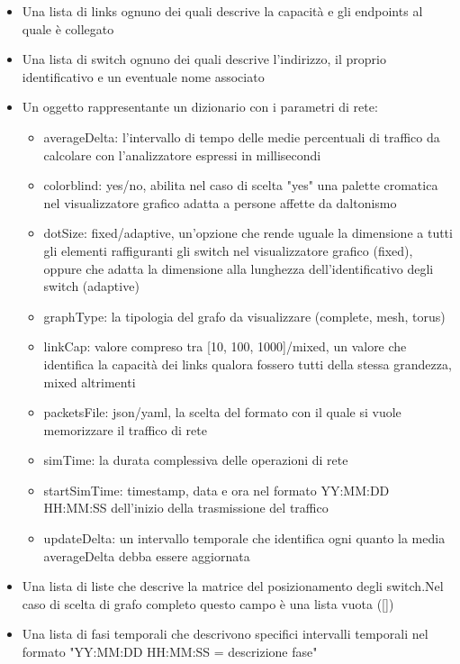 \documentclass[binding=0.6cm]{sapthesis}
\begin{document}
\begin{itemize}
    \item Una lista di links ognuno dei quali descrive la capacità e gli endpoints al quale è collegato
    \item Una lista di switch ognuno dei quali descrive l'indirizzo, il proprio identificativo e un eventuale nome associato
    \item Un oggetto rappresentante un dizionario con i parametri di rete:
    \begin{itemize}
        \item averageDelta: l'intervallo di tempo delle medie percentuali di traffico da calcolare con l'analizzatore espressi in millisecondi
        \item colorblind: yes/no, abilita nel caso di scelta "yes" una palette cromatica nel visualizzatore grafico adatta a persone affette da daltonismo
        \item dotSize: fixed/adaptive, un'opzione che rende uguale la dimensione a tutti gli elementi raffiguranti gli switch nel visualizzatore grafico (fixed), oppure che adatta la dimensione alla lunghezza dell'identificativo degli switch (adaptive)
        \item graphType: la tipologia del grafo da visualizzare (complete, mesh, torus)
        \item linkCap: valore compreso tra [10, 100, 1000]/mixed, un valore che identifica la capacità dei links qualora fossero tutti della stessa grandezza, mixed altrimenti
        \item packetsFile: json/yaml, la scelta del formato con il quale si vuole memorizzare il traffico di rete
        \item simTime: la durata complessiva delle operazioni di rete
        \item startSimTime: timestamp, data e ora nel formato YY:MM:DD HH:MM:SS dell'inizio della trasmissione del traffico
        \item updateDelta: un intervallo temporale che identifica ogni quanto la media averageDelta debba essere aggiornata
    \end{itemize}
    \item Una lista di liste che descrive la matrice del posizionamento degli switch.Nel caso di scelta di grafo completo questo campo è una lista vuota ([])
    \item Una lista di fasi temporali che descrivono specifici intervalli temporali nel formato "YY:MM:DD HH:MM:SS = descrizione fase"
\end{itemize}
\end{document}
